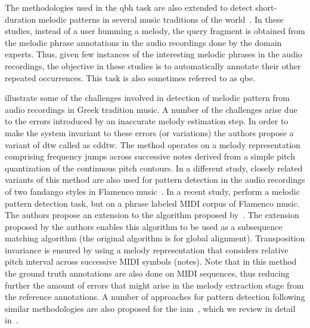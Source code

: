 The methodologies used in the \gls{qbh} task are also extended to detect short-duration melodic patterns in several music traditions of the world~\citep{pikrakis2003recognition,pikrakis2012tracking,pikrakis2016detection,Ross2012b,dutta2014modified}. In these studies, instead of a user humming a melody, the query fragment is obtained from the melodic phrase annotations in the audio recordings done by the domain experts. Thus, given few instances of the interesting melodic phrases in the audio recordings, the objective in these studies is to automatically annotate their other repeated occurrences. This task is also sometimes referred to as \gls{qbe}.  

\cite{pikrakis2003recognition} illustrate some of the challenges involved in detection of melodic pattern from audio recordings in Greek tradition music. A number of the challenges arise due to the errors introduced by an inaccurate melody estimation step. In order to make the system invariant to these errors (or variations) the authors propose a variant of \gls{dtw} called as \gls{cddtw}. The method operates on a melody representation comprising frequency jumps across successive notes derived from a simple pitch quantization of the continuous pitch contours. In a different study, closely related variants of this method are also used for pattern detection in the audio recordings of two fandango styles in Flamenco music~\citep{pikrakis2012tracking,gomez2012automatic}. In a recent study, \cite{pikrakis2016detection} perform a melodic pattern detection task, but on a phrase labeled MIDI corpus of Flamenco music. The authors propose an extension to the algorithm proposed by~\cite{needleman1970general}. The extension proposed by the authors enables this algorithm to be used as a subsequence matching algorithm (the original algorithm is for global alignment). Transposition invariance is ensured by using a melody representation that considers relative pitch interval across successive MIDI symbols (notes). Note that in this method the ground truth annotations are also done on MIDI sequences, thus reducing further the amount of errors that might arise in the melody extraction stage from the reference annotations. A number of approaches for pattern detection following similar methodologies are also proposed for the \gls{iam}~\citep{Ross2012b,dutta2014modified,ganguli2015efficient}, which we review in detail in~. 

